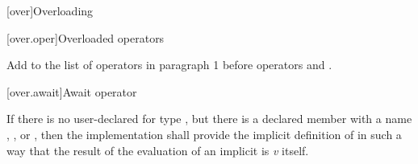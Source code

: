 
\setcounter{chapter}{12}
[over]{Overloading}

\setcounter{section}{4}
[over.oper]{Overloaded operators}

Add  to the list of operators in paragraph 1 before operators \tcode{()} and \tcode{[]}.

\setcounter{subsection}{8}
[over.await]{Await operator}%

\pnum
If there is no user-declared  for type , but there is a declared member with a name , , or , then the implementation shall provide the implicit definition of  in such a way that the result of the evaluation of an implicit  is \textit{v} itself.

